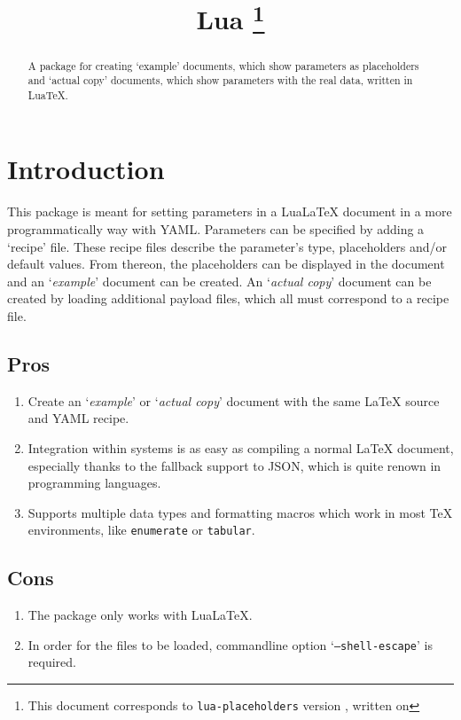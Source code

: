 \documentclass{ltxdoc}
\begin{document}
    \title{Lua \thanks{This document corresponds to \texttt{lua-placeholders} version \gitversion, written on \gitdate}}
    \maketitle
    \begin{abstract}
        A package for creating `example' documents, which show parameters as placeholders and `actual copy' documents, which show parameters with the real data, written in Lua\TeX{}.
    \end{abstract}

    \tableofcontents

    \clearpage

    \section{Introduction}
    This package is meant for setting parameters in a Lua\LaTeX{} document in a more programmatically way with YAML\@.
    Parameters can be specified by adding a `recipe' file.
    These recipe files describe the parameter's type, placeholders and/or default values.
    From thereon, the placeholders can be displayed in the document and an `\textit{example}' document can be created.
    An `\textit{actual copy}' document can be created by loading additional payload files, which all must correspond to a recipe file.

    \subsection{Pros}
    \begin{enumerate}[align=left]
        \item Create an `\textit{example}' or `\textit{actual copy}' document with the same \LaTeX{} source and YAML recipe.
        \item Integration within systems is as easy as compiling a normal \LaTeX{} document, especially thanks to the fallback support to JSON, which is quite renown in programming languages.
        \item Supports multiple data types and formatting macros which work in most \TeX{} environments, like \texttt{enumerate} or \texttt{tabular}.
    \end{enumerate}

    \subsection{Cons}
    \begin{enumerate}[align=left]
        \item The package only works with Lua\LaTeX{}.
        \item In order for the files to be loaded, commandline option `\texttt{--shell-escape}' is required.
    \end{enumerate}
\end{document}
